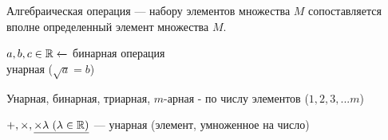 \smallskip
\begin{concept}[1]
Алгебраическая операция --- набору элементов множества $M$ сопоставляется вполне определенный элемент множества $M$.
\end{concept}
\smallskip
\begin{example}[1]
	 \hspace{0.2em}
	$a, b, c \in \mathbb{R} \xleftarrow{}$ бинарная операция\\
	\hspace*{19.8em} унарная ($\sqrt{a} = b$)
\end{example}
\smallskip
\begin{nota}
	Унарная, бинарная, триарная, $m$-арная - по числу элементов ($1, 2, 3,... m$)
\end{nota}
\begin{example}[1]
	$+, \times, \underline{\times \lambda \hspace{0.3em} (\lambda \in \mathbb{R})}$ --- унарная (элемент, умноженное на число)
\end{example}
